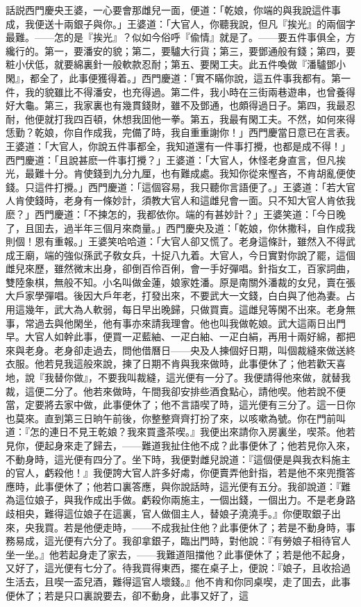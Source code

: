 話説西門慶央王婆，一心要會那雌兒一面，便道：「乾娘，你端的與我說這件事成，我便送十兩銀子與你。」王婆道：「大官人，你聽我說，但凡『挨光』的兩個字最難。——怎的是『挨光』？似如今俗呼『偸情』就是了。——要五件事俱全，方纔行的。第一，要潘安的貌；第二，要驢大行貨；第三，要鄧通般有錢；第四，要粧小伏低，就要綿裏針一般軟款忍耐；第五、要閑工夫。此五件喚做『潘驢鄧小閑』，都全了，此事便獲得着。」西門慶道：「實不瞞你說，這五件事我都有。第一件，我的貌雖比不得潘安，也充得過。第二件，我小時在三街兩巷遊串，也曾養得好大龜。第三，我家裏也有幾貫錢財，雖不及鄧通，也頗得過日子。第四，我最忍耐，他便就打我四百頓，休想我囬他一拳。第五，我最有閑工夫。不然，如何來得恁勤？乾娘，你自作成我，完備了時，我自重重謝你！」西門慶當日意已在言表。王婆道：「大官人，你說五件事都全，我知道還有一件事打攪，也都是成不得！」西門慶道：「且說甚麽一件事打攪？」王婆道：「大官人，休怪老身直言，但凡挨光，最難十分。肯使錢到九分九厘，也有難成處。我知你從來慳吝，不肯胡亂便使錢。只這件打攪。」西門慶道：「這個容易，我只聽你言語便了。」王婆道：「若大官人肯使錢時，老身有一條妙計，須教大官人和這雌兒會一面。只不知大官人肯依我麽？」西門慶道：「不揀怎的，我都依你。端的有甚妙計？」王婆笑道：「今日晚了，且囬去，過半年三個月來商量。」西門慶央及道：「乾娘，你休撒科，自作成我則個！恩有重報。」王婆笑哈哈道：「大官人卻又慌了。老身這條計，雖然入不得武成王廟，端的強似孫武子敎女兵，十捉八九着。大官人，今日實對你說了罷，這個雌兒來歷，雖然微末出身，卻倒百伶百俐，會一手好彈唱。針指女工，百家詞曲，雙陸象棋，無般不知。小名叫做金蓮，娘家姓潘。原是南關外潘裁的女兒，賣在張大戶家學彈唱。後因大戶年老，打發出來，不要武大一文錢，白白與了他為妻。占用這幾年，武大為人軟弱，每日早出晚歸，只做買賣。這雌兒等閑不出來。老身無事，常過去與他閑坐，他有事亦來請我理會。他也叫我做乾娘。武大這兩日出門早。大官人如幹此事，便買一疋藍紬、一疋白紬、一疋白絹，再用十兩好綿，都把來與老身。老身卻走過去，問他借曆日——央及人揀個好日期，叫個裁縫來做送終衣服。他若見我這般來說，揀了日期不肯與我來做時，此事便休了；他若歡天喜地，說『我替你做』，不要我叫裁縫，這光便有一分了。我便請得他來做，就替我裁，這便二分了。他若來做時，午間我卻安排些酒食點心，請他喫。他若說不便當，定要將去家中做，此事便休了；他不言語喫了時，這光便有三分了。這一日你也莫來。直到第三日晌午前後，你整整齊齊打扮了來，以咳嗽為號。你在門前叫道：『怎的連日不見王乾娘？我來買盞茶喫。』我便出來請你入房裏坐，喫茶。他若見你，便起身來走了歸去，——難道我扯住他不成？此事便休了；他若見你入來，不動身時，這光便有四分了。坐下時，我便對雌兒說道：『這個便是與我衣料施主的官人，虧殺他！』我便誇大官人許多好䖏，你便賣弄他針指，若是他不來兜攬答應時，此事便休了；他若口裏答應，與你說話時，這光便有五分。我卻說道：『難為這位娘子，與我作成出手做。虧殺你兩施主，一個出錢，一個出力。不是老身路歧相央，難得這位娘子在這裏，官人做個主人，替娘子澆澆手。』你便取銀子出來，央我買。若是他便走時，——不成我扯住他？此事便休了；若是不動身時，事務易成，這光便有六分了。我卻拿銀子，臨出門時，對他說：『有勞娘子相待官人坐一坐。』他若起身走了家去，——我難道阻擋他？此事便休了；若是他不起身，又好了，這光便有七分了。待我買得東西，擺在桌子上，便說：『娘子，且收拾過生活去，且喫一盃兒酒，難得這官人壞錢。』他不肯和你同桌喫，走了囬去，此事便休了；若是只口裏說要去，卻不動身，此事又好了，這